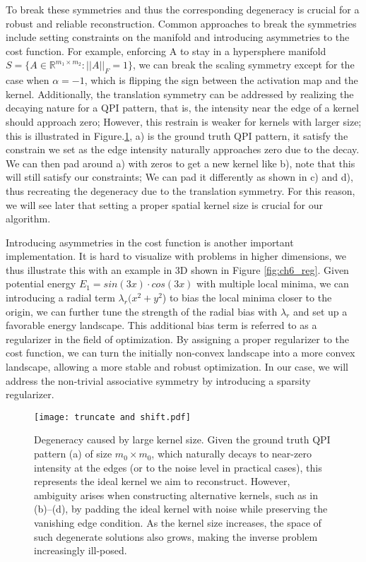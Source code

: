 To break these symmetries and thus the corresponding degeneracy is crucial for a robust and reliable reconstruction. Common approaches to break the symmetries include setting constraints on the manifold and introducing asymmetries to the cost function. For example,  enforcing A to stay in a hypersphere manifold $S = \{A \in \mathbb{R}^{m_1 \times m_2}: \vert\vert A \vert \vert_{F}= 1\}$, we can break the scaling symmetry except for the case when $\alpha = -1$, which is flipping the sign between the activation map and the kernel. Additionally, the translation symmetry can be addressed by realizing the decaying nature for a QPI pattern, that is, the intensity near the edge of a kernel should approach zero; However, this restrain is weaker for kernels with larger size; this is illustrated in Figure.\ref{fig:ch6_t&s}, a) is the ground truth QPI pattern, it satisfy the constrain we set as the edge intensity naturally approaches zero due to the decay. We can then pad around a) with zeros to get a new kernel like b), note that this will still satisfy our constraints; We can pad it differently as shown in c) and d), thus recreating the degeneracy due to the translation symmetry. For this reason, we will see later that setting a proper spatial kernel size is crucial for our algorithm. 

Introducing asymmetries in the cost function is another important implementation. It is hard to visualize with problems in higher dimensions, we thus illustrate this with an example in 3D shown in Figure \ref{fig:ch6_reg}. Given potential energy $E_1 = sin(3x)\cdot cos(3x)$ with multiple local minima, we can introducing a radial term $\lambda_r(x^2 + y^2$) to bias the local minima closer to the origin, we can further tune the strength of the radial bias with $\lambda_r$ and set up a favorable energy landscape. This additional bias term is referred to as a regularizer in the field of optimization. By assigning a proper regularizer to the cost function, we can turn the initially non-convex landscape into a more convex landscape, allowing a more stable and robust optimization. In our case, we will address the non-trivial associative symmetry by introducing a sparsity regularizer. 

\begin{figure}
	\texttt{[image: truncate and shift.pdf]} 
	\centering
	\caption{Degeneracy caused by large kernel size. Given the ground truth QPI pattern (a) of size $m_0 \times m_0$, which naturally decays to near-zero intensity at the edges (or to the noise level in practical cases), this represents the ideal kernel we aim to reconstruct. However, ambiguity arises when constructing alternative kernels, such as in (b)–(d), by padding the ideal kernel with noise while preserving the vanishing edge condition. As the kernel size increases, the space of such degenerate solutions also grows, making the inverse problem increasingly ill-posed.}
	\label{fig:ch6_t&s}
\end{figure}

